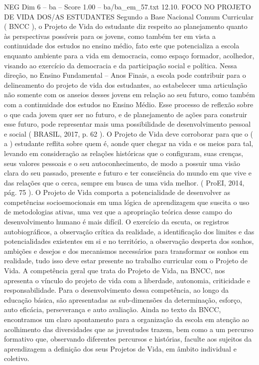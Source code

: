 \begin{textsample}{NEG Dim 6 – ba – Score 1.00 – ba/ba\_em\_57.txt}  \label{ex:f6_neg_218}
12.10.
FOCO NO PROJETO DE VIDA DOS/AS ESTUDANTES Segundo a Base Nacional Comum Curricular ( BNCC ), o Projeto de Vida do estudante diz respeito ao planejamento quanto às perspectivas possíveis para os jovens, como também ter em vista a continuidade dos estudos no ensino médio, fato este que potencializa a escola enquanto ambiente para a vida em democracia, como espaço formador, acolhedor, visando ao exercício da democracia e da participação social e política.
Nessa direção, no Ensino Fundamental – Anos Finais, a escola pode contribuir para o delineamento do projeto de vida dos estudantes, ao estabelecer uma articulação não somente com os anseios desses jovens em relação ao seu futuro, como também com a continuidade dos estudos no Ensino Médio.
Esse processo de reflexão sobre o que cada jovem quer ser no futuro, e de planejamento de ações para construir esse futuro, pode representar mais uma possibilidade de desenvolvimento pessoal e social ( BRASIL, 2017, p. 62 ).
O Projeto de Vida deve corroborar para que o ( a ) estudante reflita sobre quem é, aonde quer chegar na vida e os meios para tal, levando em consideração as relações históricas que o configuram, suas crenças, seus valores pessoais e o seu autoconhecimento, de modo a possuir uma visão clara do seu passado, presente e futuro e ter consciência do mundo em que vive e das relações que o cerca, sempre em busca de uma vida melhor. ( ProEI, 2014, pág. 75 ).
O Projeto de Vida comporta a potencialidade de desenvolver as competências socioemocionais em uma lógica de aprendizagem que suscita o uso de metodologias ativas, uma vez que a apropriação teórica desse campo do desenvolvimento humano é mais difícil.
O exercício da escuta, os registros autobiográficos, a observação crítica da realidade, a identificação dos limites e das potencialidades existentes em si e no território, a observação desperta dos sonhos, ambições e desejos e dos mecanismos necessários para transformar os sonhos em realidade, tudo isso deve estar presente no trabalho curricular com o Projeto de Vida.
A competência geral que trata do Projeto de Vida, na BNCC, nos apresenta o vínculo do projeto de vida com a liberdade, autonomia, criticidade e responsabilidade.
Para o desenvolvimento dessa competência, ao longo da educação básica, são apresentadas as sub-dimensões da determinação, esforço, auto eficácia, perseverança e auto avaliação.
Ainda no texto da BNCC, encontramos um claro apontamento para a organização da escola em atenção ao acolhimento das diversidades que as juventudes trazem, bem como a um percurso formativo que, observando diferentes percursos e histórias, faculte aos sujeitos da aprendizagem a definição dos seus Projetos de Vida, em âmbito individual e coletivo.

\end{textsample}
